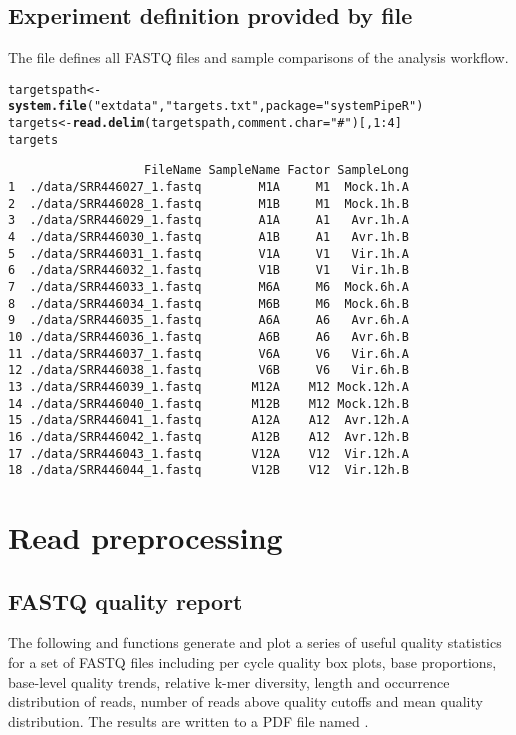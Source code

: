 \documentclass{article}\usepackage[]{graphicx}\usepackage[]{color}
\makeatletter
\newcommand{\hlnum}[1]{\textcolor[rgb]{0.686,0.059,0.569}{#1}}%
\newcommand{\hlstr}[1]{\textcolor[rgb]{0.192,0.494,0.8}{#1}}%
\newcommand{\hlopt}[1]{\textcolor[rgb]{0,0,0}{#1}}%
\newcommand{\hlstd}[1]{\textcolor[rgb]{0.345,0.345,0.345}{#1}}%
\newcommand{\hlkwb}[1]{\textcolor[rgb]{0.69,0.353,0.396}{#1}}%
\newcommand{\hlkwc}[1]{\textcolor[rgb]{0.333,0.667,0.333}{#1}}%
\newcommand{\hlkwd}[1]{\textcolor[rgb]{0.737,0.353,0.396}{\textbf{#1}}}%
\newenvironment{kframe}{%
 \def\at@end@of@kframe{}%
 \ifinner\ifhmode%
  \def\at@end@of@kframe{\end{minipage}}%
  \begin{minipage}{\columnwidth}%
 \fi\fi%
 \def\FrameCommand##1{\hskip\@totalleftmargin \hskip-\fboxsep
 \colorbox{shadecolor}{##1}\hskip-\fboxsep
     \hskip-\linewidth \hskip-\@totalleftmargin \hskip\columnwidth}%
 \MakeFramed {\advance\hsize-\width
   \@totalleftmargin\z@ \linewidth\hsize
   \@setminipage}}%
 {\par\unskip\endMakeFramed%
 \at@end@of@kframe}
\newenvironment{knitrout}{}{} %
\makeatother
\begin{document}
\subsection{Experiment definition provided by  file}
The \href{run:targets.txt}{} file defines all FASTQ files and sample comparisons of the analysis workflow. 
\begin{knitrout}
\color{fgcolor}\begin{kframe}
\begin{alltt}
\hlstd{targetspath} \hlkwb{<-} \hlkwd{system.file}\hlstd{(}\hlstr{"extdata"}\hlstd{,} \hlstr{"targets.txt"}\hlstd{,} \hlkwc{package}\hlstd{=}\hlstr{"systemPipeR"}\hlstd{)}
\hlstd{targets} \hlkwb{<-} \hlkwd{read.delim}\hlstd{(targetspath,} \hlkwc{comment.char} \hlstd{=} \hlstr{"#"}\hlstd{)[,}\hlnum{1}\hlopt{:}\hlnum{4}\hlstd{]}
\hlstd{targets}
\end{alltt}
\begin{verbatim}
                   FileName SampleName Factor SampleLong
1  ./data/SRR446027_1.fastq        M1A     M1  Mock.1h.A
2  ./data/SRR446028_1.fastq        M1B     M1  Mock.1h.B
3  ./data/SRR446029_1.fastq        A1A     A1   Avr.1h.A
4  ./data/SRR446030_1.fastq        A1B     A1   Avr.1h.B
5  ./data/SRR446031_1.fastq        V1A     V1   Vir.1h.A
6  ./data/SRR446032_1.fastq        V1B     V1   Vir.1h.B
7  ./data/SRR446033_1.fastq        M6A     M6  Mock.6h.A
8  ./data/SRR446034_1.fastq        M6B     M6  Mock.6h.B
9  ./data/SRR446035_1.fastq        A6A     A6   Avr.6h.A
10 ./data/SRR446036_1.fastq        A6B     A6   Avr.6h.B
11 ./data/SRR446037_1.fastq        V6A     V6   Vir.6h.A
12 ./data/SRR446038_1.fastq        V6B     V6   Vir.6h.B
13 ./data/SRR446039_1.fastq       M12A    M12 Mock.12h.A
14 ./data/SRR446040_1.fastq       M12B    M12 Mock.12h.B
15 ./data/SRR446041_1.fastq       A12A    A12  Avr.12h.A
16 ./data/SRR446042_1.fastq       A12B    A12  Avr.12h.B
17 ./data/SRR446043_1.fastq       V12A    V12  Vir.12h.A
18 ./data/SRR446044_1.fastq       V12B    V12  Vir.12h.B
\end{verbatim}
\end{kframe}
\end{knitrout}

\section{Read preprocessing}
\subsection{FASTQ quality report}
The following  and  functions generate and plot a series of
useful quality statistics for a set of FASTQ files including per cycle quality
box plots, base proportions, base-level quality trends, relative k-mer
diversity, length and occurrence distribution of reads, number of reads above
quality cutoffs and mean quality distribution. The results are written to a PDF file named 
\href{run:./results/fastqReport.pdf}{}.
\end{document}
